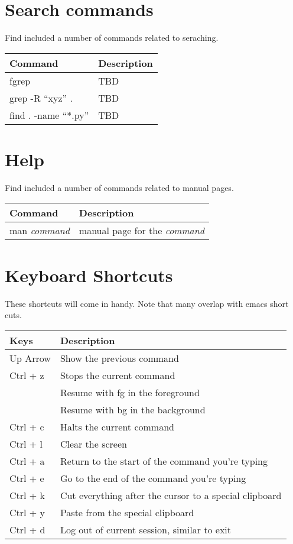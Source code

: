\section{Search commands}\label{search-commands}

Find included a number of commands related to seraching.

\begin{tabular}{ll}
Command & Description \\
\hline
fgrep &  TBD \\
grep -R ``xyz'' . & TBD \\
find . -name ``*.py'' &  TBD \\
\end{tabular}

\section{Help}\label{help}

Find included a number of commands related to manual pages.

\begin{tabular}{ll}
Command & Description \\
\hline
man \emph{command} & manual page for the \emph{command} \\
\end{tabular}

\section{Keyboard Shortcuts}\label{keyboard-shortcuts}

These shortcuts will come in handy. Note that many overlap with emacs
short cuts.

\begin{tabular}{ll}
Keys     & Description  \\
\hline
Up Arrow & Show the previous command\\
Ctrl + z & Stops the current command  \\
         & Resume with fg in the foreground \\
         & Resume with bg in the background \\
Ctrl + c & Halts the current command\\
Ctrl + l & Clear the screen\\
Ctrl + a & Return to the start of the command you're typing\\
Ctrl + e & Go to the end of the command you're typing\\
Ctrl + k & Cut everything after the cursor to a special clipboard\\
Ctrl + y & Paste from the special clipboard \\
Ctrl + d & Log out of current session, similar to exit \\
\end{tabular}

